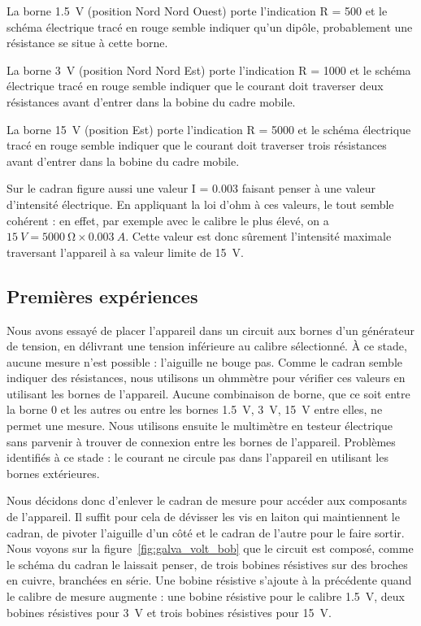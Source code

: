 \documentclass[12pt,a4paper,fleqn]{article}
\begin{document}
La borne \SI{1.5}{V} (position Nord Nord Ouest) porte l'indication \og R = 500 \fg{} et le schéma électrique tracé en rouge semble indiquer qu'un dipôle, probablement une résistance se situe à cette borne.

La borne \SI{3}{V} (position Nord Nord Est) porte l'indication \og R = 1000 \fg{} et le schéma électrique tracé en rouge semble indiquer que le courant doit traverser deux résistances avant d'entrer dans la bobine du cadre mobile.

La borne \SI{15}{V} (position Est) porte l'indication \og R = 5000 \fg{} et le schéma électrique tracé en rouge semble indiquer que le courant doit traverser trois résistances avant d'entrer dans la bobine du cadre mobile.

Sur le cadran figure aussi une valeur \og I = 0.003 \fg{} faisant penser à une valeur d'intensité électrique.
En appliquant la loi d'ohm à ces valeurs, le tout semble cohérent : en effet, par exemple avec le calibre le plus élevé, on a $ \SI{15}{V} = \SI{5000}{\ohm} \times \SI{0.003}{A}$.
Cette valeur est donc sûrement l'intensité maximale traversant l'appareil à sa valeur limite de \SI{15}{V}.

\subsection{Premières expériences}

Nous avons essayé de placer l'appareil dans un circuit aux bornes d'un générateur de tension, en délivrant une tension inférieure au calibre sélectionné.
À ce stade, aucune mesure n'est possible : l'aiguille ne bouge pas.
Comme le cadran semble indiquer des résistances, nous utilisons un ohmmètre pour vérifier ces valeurs en utilisant les bornes de l'appareil.
Aucune combinaison de borne, que ce soit entre la borne 0 et les autres ou entre les bornes \SI{1.5}{V}, \SI{3}{V}, \SI{15}{V} entre elles, ne permet une mesure.
Nous utilisons ensuite le multimètre en testeur électrique sans parvenir à trouver de connexion entre les bornes de l'appareil.
Problèmes identifiés à ce stade : le courant ne circule pas dans l'appareil en utilisant les bornes extérieures.

Nous décidons donc d'enlever le cadran de mesure pour accéder aux composants de l'appareil. Il suffit pour cela de dévisser les vis en laiton qui maintiennent le cadran, de pivoter l'aiguille d'un côté et le cadran de l'autre pour le faire sortir.
Nous voyons sur la figure~\ref{fig:galva_volt_bob} que le circuit est composé, comme le schéma du cadran le laissait penser, de trois bobines résistives sur des broches en cuivre, branchées en série.
Une bobine résistive s'ajoute à la précédente quand le calibre de mesure augmente : une bobine résistive pour le calibre \SI{1.5}{V}, deux bobines résistives pour \SI{3}{V} et trois bobines résistives pour \SI{15}{V}.
\end{document}
